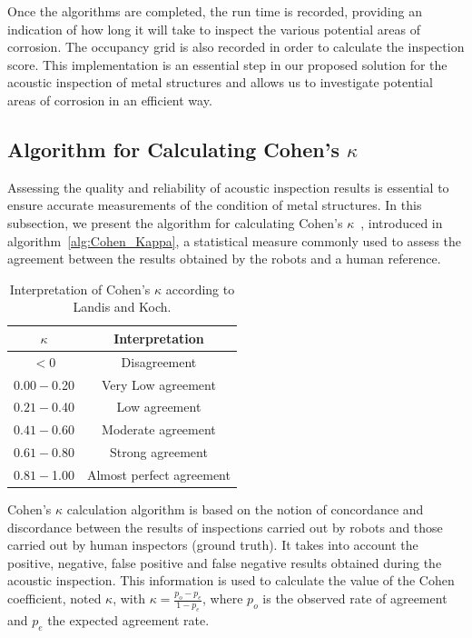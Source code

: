 Once the algorithms are completed, the run time is recorded, providing an indication of how long it will take to inspect the various potential areas of corrosion.
The occupancy grid is also recorded in order to calculate the inspection score.
This implementation is an essential step in our proposed solution for the acoustic inspection of metal structures and allows us to investigate potential areas of corrosion in an efficient way.

\subsection*{Algorithm for Calculating Cohen's $\kappa$}

Assessing the quality and reliability of acoustic inspection results is essential to ensure accurate measurements of the condition of metal structures.
In this subsection, we present the algorithm for calculating Cohen's $\kappa$~\cite{enwiki:1130024730}, introduced in algorithm~\ref{alg:Cohen_Kappa}, a statistical measure commonly used to assess the agreement between the results obtained by the robots and a human reference.

\begin{table}[h!]
	\centering
	\begin{tabular}{|c|c|}
		\hline
		$\kappa$ & Interpretation \\
		\hline
		$< 0$ & Disagreement \\
		\hline
		$0.00 - $0.20 & Very Low agreement \\
		\hline
		$0.21 - $0.40 & Low agreement \\
		\hline
		$0.41 - $0.60 & Moderate agreement \\
		\hline
		$0.61 - $0.80 & Strong agreement \\
		\hline
		$0.81 - $1.00 & Almost perfect agreement \\
		\hline
	\end{tabular}
	\caption{Interpretation of Cohen's $\kappa$ according to Landis and Koch.}
	\label{tab:Kappa_Cohen}
\end{table}

Cohen's $\kappa$ calculation algorithm is based on the notion of concordance and discordance between the results of inspections carried out by robots and those carried out by human inspectors (ground truth).
It takes into account the positive, negative, false positive and false negative results obtained during the acoustic inspection.
This information is used to calculate the value of the Cohen coefficient, noted $\kappa$, with $\kappa = \frac{p_o - p_e}{1 - p_e}$, where $p_o$ is the observed rate of agreement and $p_e$ the expected agreement rate.

